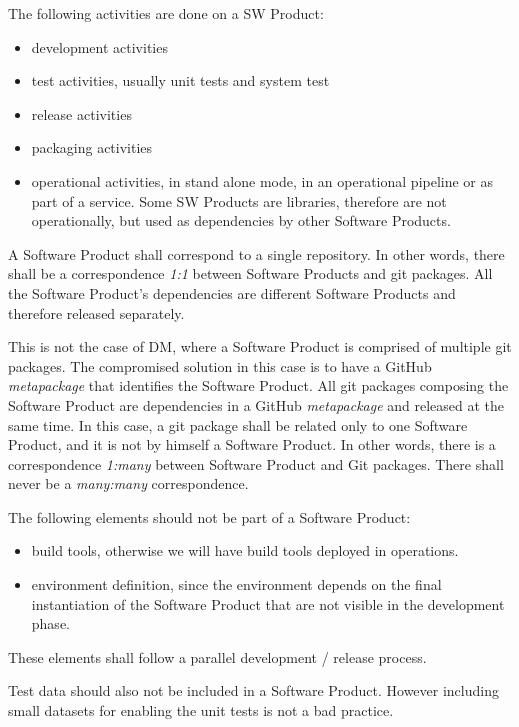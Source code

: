 The following activities are done on a \gls{SW} Product:
\begin{itemize}
\item development activities
\item test activities, usually unit tests and system test
\item release activities
\item packaging activities
\item operational activities, in stand alone mode, in an operational pipeline or as part of a service. Some \gls{SW} Products are libraries, therefore are not operationally, but used as dependencies by other Software Products.
\end{itemize}

A Software Product shall correspond to a single repository.
In other  words, there shall be a correspondence \textit{1:1} between Software Products and git packages.
All the Software Product's dependencies are different Software Products and therefore released separately.

This is not the case of \gls{DM}, where a Software Product is comprised of multiple git packages.
The compromised solution in this case is to have a GitHub \textit{metapackage} that identifies the Software Product.
All git packages composing the Software Product are dependencies in a GitHub \textit{metapackage} and released at the same time.
In this case, a git package shall be related only to one Software Product, and it is not by himself a Software Product.
In other words, there is a correspondence \textit{1:many} between Software Product and Git packages.
There shall never be a \textit{many:many} correspondence.

The following elements should not be part of a Software Product:

\begin{itemize}
\item build tools, otherwise we will have build tools deployed in operations.
\item environment definition, since the environment depends on the final instantiation of the Software Product that are not visible in the development phase.
\end{itemize}

These elements shall follow a parallel development / release process.

Test data should also not be included in a Software Product. However including small datasets for enabling the unit tests is not a bad practice.


